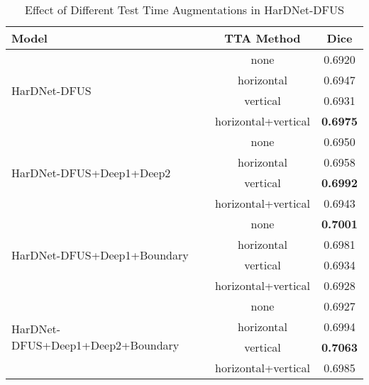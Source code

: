 \documentclass[runningheads]{llncs}
\begin{document}
\begin{table}[!ht] 
\centering
\caption{Effect of Different Test Time Augmentations in HarDNet-DFUS\label{tab:tta}}
\begin{tabular}{l|c|c}
\hline \hline
                        Model   & TTA Method            & Dice  \\ \hline \hline
\multirow{4}{*}{HarDNet-DFUS} & none                    & 0.6920  \\ \cline{2-3}
                                & horizontal            & 0.6947 \\ \cline{2-3}
                                & vertical              & 0.6931 \\ \cline{2-3}
                                & horizontal+vertical   & { \bfseries 0.6975} \\ \hline

\multirow{4}{*}{HarDNet-DFUS+Deep1+Deep2} &        none & 0.6950  \\ \cline{2-3}
                                & horizontal            & 0.6958 \\ \cline{2-3}
                                & vertical              & { \bfseries 0.6992} \\ \cline{2-3}
                                & horizontal+vertical   & 0.6943 \\ \hline
                                
\multirow{4}{*}{HarDNet-DFUS+Deep1+Boundary} &    none  & { \bfseries 0.7001}  \\ \cline{2-3}
                                & horizontal            & 0.6981 \\ \cline{2-3}
                                & vertical              & 0.6934 \\ \cline{2-3}
                                & horizontal+vertical   & 0.6928 \\ \hline

\multirow{4}{*}{HarDNet-DFUS+Deep1+Deep2+Boundary} & none& 0.6927  \\ \cline{2-3}
                                & horizontal            & 0.6994 \\ \cline{2-3}
                                & vertical              & { \bfseries 0.7063} \\ \cline{2-3}
                                & horizontal+vertical   & 0.6985 \\ \hline
\end{tabular}
\end{table}
\end{document}
